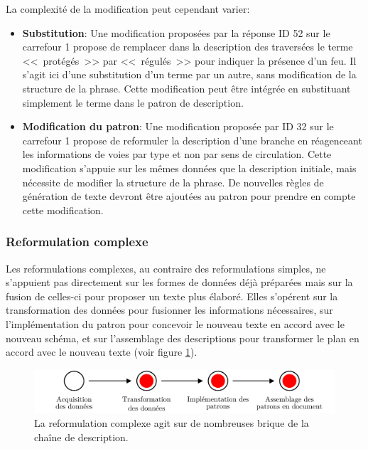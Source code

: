 La complexité de la modification peut cependant varier:
\begin{itemize}
    \item \textbf{Substitution}: Une modification proposées par la réponse ID 52 sur le carrefour 1 propose de remplacer dans la description des traversées le terme <<~protégés~>> par <<~régulés~>> pour indiquer la présence d'un feu. Il s'agit ici d'une substitution d'un terme par un autre, sans modification de la structure de la phrase. Cette modification peut être intégrée en substituant simplement le terme dans le patron de description.
    \item \textbf{Modification du patron}: Une modification proposée par ID 32 sur le carrefour 1 propose de reformuler la description d'une branche en réagenceant les informations de voies par type et non par sens de circulation. Cette modification s'appuie sur les mêmes données que la description initiale, mais nécessite de modifier la structure de la phrase. De nouvelles règles de génération de texte devront être ajoutées au patron pour prendre en compte cette modification.
\end{itemize}

\subsubsection{Reformulation complexe}

Les reformulations complexes, au contraire des reformulations simples, ne s'appuient pas directement sur les formes de données déjà préparées mais sur la fusion de celles-ci pour proposer un texte plus élaboré. Elles s'opérent sur la transformation des données pour fusionner les informations nécessaires, sur l'implémentation du patron pour concevoir le nouveau texte en accord avec le nouveau schéma, et sur l'assemblage des descriptions pour transformer le plan en accord avec le nouveau texte (voir figure \ref{fig:evaluation_reformulation_complexe}).

\begin{figure}
    \centering
    \includegraphics[width=\textwidth]{images/evaluation/pipeline/pipeline_reformulation_complexe.pdf}
    \caption[Reformulation complexe dans la chaîne de description]{La reformulation complexe agit sur de nombreuses brique de la chaîne de description.}
    \label{fig:evaluation_reformulation_complexe}
\end{figure}

